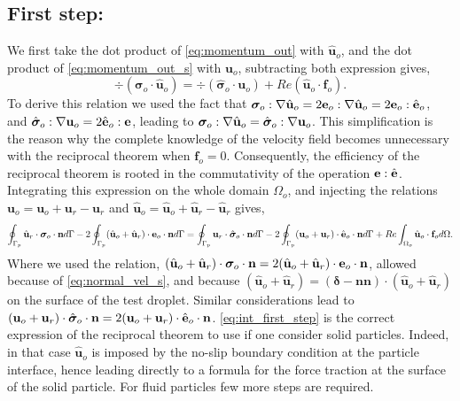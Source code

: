 \subsection{First step:}
We first take the dot product of \ref{eq:momentum_out} with $\hat{\textbf{u}}_{o}$, and the dot product of \ref{eq:momentum_out_s} with $\textbf{u}_{o}$, subtracting both expression gives, 
\begin{equation}
    \div (\bm\sigma_{o}\cdot \hat{\textbf{u}}_o)
    =
    \div (\hat{\bm\sigma}_{o}\cdot \textbf{u}_o)
    + Re (\hat{\textbf{u}}_{o}\cdot \textbf{f}_{o}). 
    \label{eq:first_step_out}
\end{equation}
To derive this relation we used the fact that $\bm\sigma_o :\mathbf{\nabla} \hat{\textbf{u}}_o = 2\textbf{e}_o :\mathbf{\nabla} \hat{\textbf{u}}_o = 2{\textbf e}_o : \hat{\textbf e}_o$, and  $\hat{\bm\sigma}_o :\mathbf{\nabla} {\textbf{u}}_o = 2\hat{\textbf{e}}_o : \textbf{e}$, leading to $\bm\sigma_o :\mathbf{\nabla} \hat{\textbf{u}}_o = \hat{\bm\sigma}_o :\mathbf{\nabla} {\textbf{u}}_o$. 
This simplification is the reason why the complete knowledge of the velocity field becomes unnecessary with the reciprocal theorem when $\textbf{f}_o = 0$.
Consequently, the  efficiency of the reciprocal theorem is rooted in the commutativity of the operation $\textbf e:\hat{\textbf e}$. 
Integrating this expression on the whole domain $\Omega_{o}$, and injecting the relations $\textbf{u}_o = \textbf{u}_o+\textbf{u}_r-\textbf{u}_r$ and $\hat{\textbf{u}}_o = \hat{\textbf{u}}_o+\hat{\textbf{u}}_r-\hat{\textbf{u}}_r$ gives, 
\begin{equation}
    \intS[p]{\hat{\textbf{u}}_{r} \cdot  \bm\sigma_{o}\cdot \textbf{n}}
    - 2\intS[p]{(\hat{\textbf{u}}_{o} + \hat{\textbf{u}}_r) \cdot  \textbf e_{o}\cdot \textbf{n}}
    =
    \intS[p]{\textbf{u}_{r}\cdot \hat{\bm\sigma}_{o}\cdot \textbf{n}}
    - 2\intS[p]{(\textbf{u}_{o} + \textbf{u}_r)\cdot \hat{\textbf e}_{o}\cdot \textbf{n}}
    + 
    Re\intO[o]{\hat{\textbf{u}}_{o}\cdot \textbf{f}_{o}}.
    \label{eq:int_first_step}
\end{equation}
Where we used the relation, $(\hat{\textbf{u}}_{o} + \hat{\textbf{u}}_r) \cdot  \bm\sigma_{o}\cdot \textbf{n} = 2 (\hat{\textbf{u}}_{o} + \hat{\textbf{u}}_r) \cdot  \textbf e_{o}\cdot \textbf{n}$, allowed because of \ref{eq:normal_vel_s}, and because $(\hat{\textbf{u}}_{o} + \hat{\textbf{u}}_r) = (\bm\delta - \textbf{nn})\cdot (\hat{\textbf{u}}_{o} + \hat{\textbf{u}}_r)$ on the surface of the test droplet. 
Similar considerations lead to $({\textbf{u}}_{o} + {\textbf{u}_r}) \cdot  \hat{\bm\sigma}_{o}\cdot \textbf{n} =2  ({\textbf{u}}_{o} + {\textbf{u}_r}) \cdot  \hat{\textbf e}_{o}\cdot \textbf{n}$. 
\ref{eq:int_first_step} is the correct expression of the reciprocal theorem to use if one consider solid particles.
Indeed, in that case $\hat{\textbf{u}}_{o}$ is imposed by the no-slip boundary condition at the particle interface, hence leading directly to a formula for the force traction at the surface of the solid particle. 
For fluid particles few more steps are required. 
 
